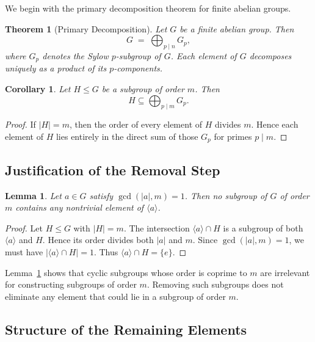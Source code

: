 \documentclass[11pt]{article}
\newtheorem{theorem}{Theorem}[section]
\newtheorem{lemma}{Lemma}[section]
\newtheorem{corollary}{Corollary}[section]
\begin{document}
	We begin with the primary decomposition theorem for finite abelian groups.
	
	\begin{theorem}[Primary Decomposition]
		Let $G$ be a finite abelian group. Then
		\[
		G \;=\; \bigoplus_{p \mid n} G_p,
		\]
		where $G_p$ denotes the Sylow $p$-subgroup of $G$. Each element of $G$ decomposes uniquely as a product of its $p$-components.
	\end{theorem}
	
	\begin{corollary}\label{primarycor}
		Let $H \le G$ be a subgroup of order $m$. Then
		\[
		H \subseteq \bigoplus_{p \mid m} G_p.
		\]
	\end{corollary}
	
	\begin{proof}
		If $|H|=m$, then the order of every element of $H$ divides $m$. Hence each element of $H$ lies entirely in the direct sum of those $G_p$ for primes $p \mid m$.
	\end{proof}
	
	\subsection{Justification of the Removal Step}
	
	\begin{lemma}\label{coprimelemma}
		Let $a \in G$ satisfy $\gcd(|a|,m)=1$. Then no subgroup of $G$ of order $m$ contains any nontrivial element of $\langle a \rangle$.
	\end{lemma}
	
	\begin{proof}
		Let $H \le G$ with $|H|=m$. The intersection $\langle a\rangle \cap H$ is a subgroup of both $\langle a\rangle$ and $H$. Hence its order divides both $|a|$ and $m$. Since $\gcd(|a|,m)=1$, we must have $|\langle a\rangle \cap H|=1$. Thus $\langle a\rangle \cap H=\{e\}$.
	\end{proof}
	
	\noindent
	Lemma~\ref{coprimelemma} shows that cyclic subgroups whose order is coprime to $m$ are irrelevant for constructing subgroups of order $m$. Removing such subgroups does not eliminate any element that could lie in a subgroup of order $m$.
	
	\subsection{Structure of the Remaining Elements}
	
\end{document}
